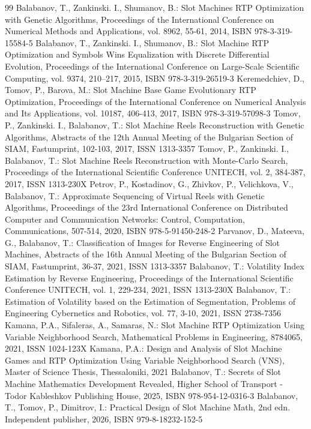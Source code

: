 \documentclass[12pt,twoside,openany]{book}
\begin{document}
\clearpage
\begingroup
\makeatletter
\let\ps@plain\ps@empty
\makeatother

\pagestyle{empty}

\begin{thebibliography}{99}
\thispagestyle{empty}
 Balabanov, T., Zankinski. I., Shumanov, B.: Slot Machines RTP Optimization with Genetic Algorithms, Proceedings of the International Conference on Numerical Methods and Applications, vol. 8962, 55-61, 2014, ISBN 978-3-319-15584-5
 Balabanov, T., Zankinski. I., Shumanov, B.: Slot Machine RTP Optimization and Symbols Wins Equalization with Discrete Differential Evolution, Proceedings of the International Conference on Large-Scale Scientific Computing, vol. 9374, 210–217, 2015, ISBN 978-3-319-26519-3
 Keremedchiev, D., Tomov, P., Barova, M.: Slot Machine Base Game Evolutionary RTP Optimization, Proceedings of the International Conference on Numerical Analysis and Its Applications, vol. 10187, 406-413, 2017, ISBN 978-3-319-57098-3
 Tomov, P., Zankinski. I., Balabanov, T.: Slot Machine Reels Reconstruction with Genetic Algorithms, Abstracts of the 12th Annual Meeting of the Bulgarian Section of SIAM, Fastumprint, 102-103, 2017, ISSN 1313-3357
 Tomov, P., Zankinski. I., Balabanov, T.: Slot Machine Reels Reconstruction with Monte-Carlo Search, Proceedings of the International Scientific Conference UNITECH, vol. 2, 384-387, 2017, ISSN 1313-230X
 Petrov, P., Kostadinov, G., Zhivkov, P., Velichkova, V., Balabanov, T.: Approximate Sequencing of Virtual Reels with Genetic Algorithms, Proceedings of the 23rd International Conference on Distributed Computer and Communication Networks: Control, Computation, Communications, 507-514, 2020, ISBN 978-5-91450-248-2
 Parvanov, D., Mateeva, G., Balabanov, T.: Classification of Images for Reverse Engineering of Slot Machines, Abstracts of the 16th Annual Meeting of the Bulgarian Section of SIAM, Fastumprint, 36-37, 2021, ISSN 1313-3357
 Balabanov, T.: Volatility Index Estimation by Reverse Engineering, Proceedings of the International Scientific Conference UNITECH, vol. 1, 229-234, 2021, ISSN 1313-230X
 Balabanov, T.: Estimation of Volatility based on the Estimation of Segmentation, Problems of Engineering Cybernetics and Robotics, vol. 77, 3-10, 2021, ISSN 2738-7356
 Kamana, P.A., Sifaleras, A., Samaras, N.: Slot Machine RTP Optimization Using Variable Neighborhood Search, Mathematical Problems in Engineering, 8784065, 2021, ISSN 1024-123X
 Kamana, P.A.: Design and Analysis of Slot Machine Games and RTP Optimization Using Variable Neighborhood Search (VNS), Master of Science Thesis, Thessaloniki, 2021
 Balabanov, T.: Secrets of Slot Machine Mathematics Development Revealed, Higher School of Transport - Todor Kableshkov Publishing House, 2025, ISBN 978-954-12-0316-3
 Balabanov, T., Tomov, P., Dimitrov, I.: Practical Design of Slot Machine Math, 2nd edn. Independent publisher, 2026, ISBN 979-8-18232-152-5
\end{thebibliography}
\end{document}
